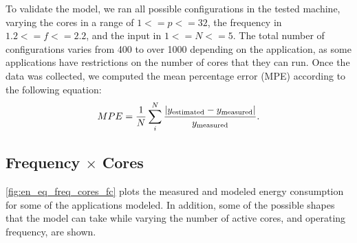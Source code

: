 To validate the model, we ran all possible configurations in the tested machine, varying the cores in a range of $1<=p<=32$, the frequency in $1.2<=f<=2.2$, and the input in $1<=N<=5$. The total number of configurations varies from 400 to over 1000 depending on the application, as some applications have restrictions on the number of cores that they can run. Once the data was collected, we computed the mean percentage error (MPE) according to the following equation:
\begin{equation}
	MPE = \frac{1}{N} \sum_i^N \frac{|y_{\rm estimated}-y_{\rm measured}|}{y_{\rm measured}}.
	\label{eq:mpe}
\end{equation}

\subsection{Frequency $\times$ Cores} \label{subsec:mvme_frequency_x_cores}
\cref{fig:en_eq_freq_cores_fc} plots the measured and modeled energy consumption for some of the applications modeled. In addition,  some of the possible shapes that the model can take while varying the number of active cores, and operating frequency, are shown.%

